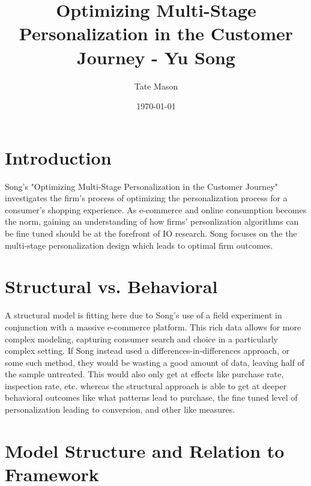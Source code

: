 \documentclass[11pt]{article}
\title{Optimizing Multi-Stage Personalization in the Customer Journey - Yu Song}
\author{Tate Mason}
\date{\today}
\theoremstyle{definition}
\theoremstyle{remark}
\begin{document}
\maketitle
\thispagestyle{empty}


\newpage
\setcounter{page}{1}

\section{Introduction}

Song's "Optimizing Multi-Stage Personalization in the Customer Journey" \nocite{song_optimizing_nodate} investigates the firm's
process of optimizing the personalization process for a consumer's shopping experience. As e-commerce
and online consumption becomes the norm, gaining an understanding of how firms' personlization algorithms
can be fine tuned should be at the forefront of IO research. Song focuses on the the multi-stage personalization design
which leads to optimal firm outcomes.

\section{Structural vs. Behavioral}

A structural model is fitting here due to Song's use of a field experiment in conjunction with a massive e-commerce platform. This rich data allows for 
more complex modeling, capturing consumer search and choice in a particularly complex setting. If Song instead used a differences-in-differences approach,
or some such method, they would be wasting a good amount of data, leaving half of the sample untreated. This would also only get at effects like purchase rate,
inspection rate, etc. whereas the structural approach is able to get at deeper behavioral outcomes like what patterns lead to purchase, the fine tuned level of personalization leading to conversion,
and other like measures.

\section{Model Structure and Relation to Framework}
\end{document}
